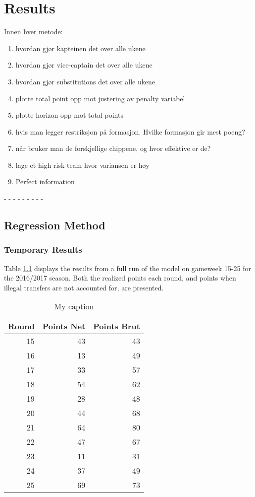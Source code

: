 
\chapter{Results}
Innen hver metode:
\begin{enumerate}
    \item hvordan gjør kapteinen det over alle ukene
    \item hvordan gjør vice-captain det over alle ukene
    \item hvordan gjør substitutions det over alle ukene
    \item plotte total point opp mot justering av penalty variabel
    \item plotte horizon opp mot total points
    \item hvis man legger restriksjon på formasjon. Hvilke formasjon gir mest poeng?
    \item når bruker man de forskjellige chippene, og hvor effektive er de?  
    \item lage et high risk team hvor variansen er høy
    \item Perfect information
\end{enumerate}
-  
- 
-  
-  
-  
- 
- 
-  
-  
\section{Regression Method}
\subsection{Temporary Results}

Table \ref{tab:results_reg_16/17} displays the results from a full run of the model on gameweek 15-25 for the 2016/2017 season. Both the realized points each round, and points when illegal transfers are not accounted for, are presented.


\begin{table}[]
\centering
\caption{My caption}
\label{tab:results_reg_16/17}
\begin{tabular}{@{}rrr@{}}
\toprule
Round & Points Net & Points Brut \\ 
\midrule
15    & 43     & 43             \\
16    & 13     & 49             \\
17    & 33     & 57             \\
18    & 54     & 62             \\
19    & 28     & 48             \\
20    & 44     & 68             \\
21    & 64     & 80             \\
22    & 47     & 67             \\
23    & 11     & 31             \\
24    & 37     & 49             \\
25    & 69     & 73             \\ 
\end{tabular}
\end{table}


